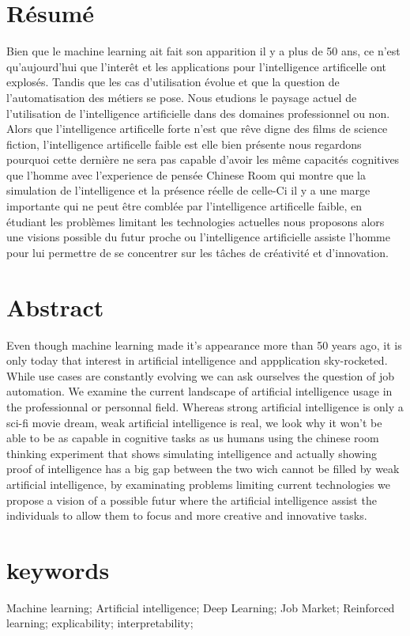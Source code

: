 \section*{Résumé}
Bien que le machine learning ait fait son apparition il y a plus de 50 ans,
ce n'est qu'aujourd'hui que l'interêt et les applications pour
l'intelligence artificelle ont explosés. Tandis que les cas d'utilisation 
évolue et que la question de l'automatisation des métiers se pose.
Nous etudions le paysage actuel de l'utilisation de l'intelligence 
artificielle dans des domaines professionnel ou non.
Alors que l'intelligence artificelle forte n'est que rêve digne des films 
de science fiction, l'intelligence artificelle faible est elle bien présente 
nous regardons pourquoi cette dernière ne sera pas capable d'avoir les même capacités 
cognitives que l'homme avec l'experience de pensée Chinese Room qui 
montre que la simulation de l'intelligence et la présence réelle de celle-Ci 
il y a une marge importante qui ne peut être comblée 
par l'intelligence artificelle faible, en étudiant les problèmes limitant les 
technologies actuelles nous proposons alors une visions possible du futur 
proche ou l'intelligence artificielle assiste l'homme pour lui 
permettre de se concentrer sur les tâches de créativité et d'innovation. 

\section*{Abstract}
Even though machine learning made it's appearance more than 50 years ago,
it is only today that interest in artificial intelligence and appplication
sky-rocketed. While use cases are constantly evolving we can ask ourselves 
the question of job automation.
We examine the current landscape of artificial intelligence usage in the professionnal
or personnal field.
Whereas strong artificial intelligence is only a sci-fi movie dream, weak 
artificial intelligence is real, we look why it won't be able to be as capable 
in cognitive tasks as us humans using the chinese room thinking experiment 
that shows simulating intelligence and actually showing proof of intelligence 
has a big gap between the two wich cannot be filled by weak artificial intelligence,
by examinating problems limiting current technologies we propose 
a vision of a possible futur where the artificial intelligence assist the individuals
to allow them to focus and more creative and innovative tasks.

\section*{keywords}
Machine learning; Artificial intelligence; Deep Learning; 
Job Market; Reinforced learning; explicability; interpretability;

